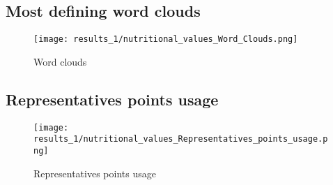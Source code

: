 \documentclass[\main/main.tex]{subfiles}
\begin{document}
\subsection{Most defining word clouds}
\begin{figure}
	\texttt{[image: results\_1/nutritional\_values\_Word\_Clouds.png]}
	\caption{Word clouds}
\end{figure}
\subsection{Representatives points usage}
\begin{figure}
	\texttt{[image: results\_1/nutritional\_values\_Representatives\_points\_usage.png]}
	\caption{Representatives points usage}
\end{figure}
\end{document}
